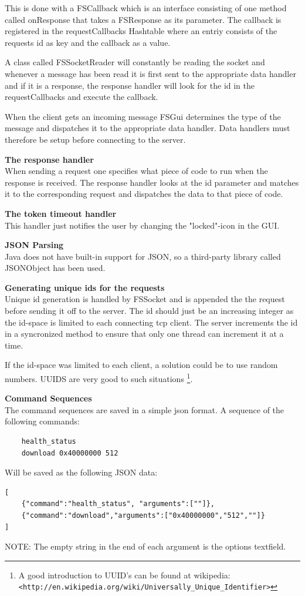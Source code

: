 This is done with a FSCallback which is an interface consisting of one method called onResponse that takes a FSResponse as its parameter. The callback is registered in the requestCallbacks Hashtable where an entriy consists of the requests id as key and the callback as a value.

A class called FSSocketReader will constantly be reading the socket and whenever a message has been read it is first sent to the appropriate data handler and if it is a response, the response handler will look for the id in the requestCallbacks and execute the callback.

When the client gets an incoming message FSGui determines the type of the message and dispatches it to the appropriate data handler. Data handlers must therefore be setup before connecting to the server.

\textbf{The response handler} \\
When sending a request one specifies what piece of code to run when the response is received.
The response handler looks at the id parameter and matches it to the corresponding request and dispatches the data to that piece of code.

\textbf{The token timeout handler} \\
This handler just notifies the user by changing the "locked"-icon in the GUI.

\textbf{JSON Parsing} \\
Java does not have built-in support for JSON, so a third-party library called JSONObject has been used.

\textbf{Generating unique ids for the requests} \\
Unique id generation is handled by FSSocket and is appended the the request before sending it off to the server.
The id should just be an increasing integer as the id-space is limited to each connecting tcp client. The server increments the id in a syncronized method to ensure that only one thread can increment it at a time.

If the id-space was limited to each client, a solution could be to use random numbers. UUIDS are very good to such situations \footnote{A good introduction to UUID's can be found at wikipedia: \texttt{<http://en.wikipedia.org/wiki/Universally\_Unique\_Identifier>} }.

\textbf{Command Sequences} \\
The command sequences are saved in a simple json format. A sequence of the following commands:
\begin{verbatim}
	health_status
	download 0x40000000 512
\end{verbatim}
Will be saved as the following JSON data:
\begin{verbatim}
[
	{"command":"health_status", "arguments":[""]},
	{"command":"download","arguments":["0x40000000","512",""]}
]
\end{verbatim}
NOTE: The empty string in the end of each argument is the options textfield.

